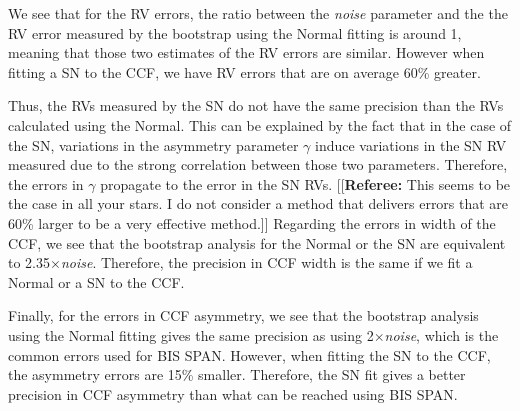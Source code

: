 \documentclass[11pt, oneside]{article}
\newcommand{\comment}[1]{{\color{red}[[\textbf{Referee: }#1]]}}
\begin{document}
We see that for the RV errors, the ratio between the \emph{noise} parameter and the the RV error measured by the bootstrap using the Normal fitting is around 1, meaning that those two estimates of the RV errors are similar. However when fitting a SN to the CCF, we have RV errors that are on average 60\% greater. 

Thus, the RVs measured by the SN do not have the same precision than the RVs calculated using the Normal. This can be explained by the fact that in the case of the SN, variations in the asymmetry parameter $\gamma$ induce variations in the SN RV measured due to the strong correlation between those two parameters. Therefore, the errors in $\gamma$ propagate to the error in the SN RVs.
\comment{This seems to be the case in all your stars. I do not consider a method that delivers errors that are 60\% larger to be a very effective method.}
Regarding the errors in width of the CCF, we see that the bootstrap analysis for the Normal or the SN are equivalent to 2.35$\times$\emph{noise}. Therefore, the precision in CCF width is the same if we fit a Normal or a SN to the CCF.

Finally, for the errors in CCF asymmetry, we see that the bootstrap analysis using the Normal fitting gives the same precision as using 2$\times$\emph{noise}, which is the common errors used for BIS SPAN. However, when fitting the SN to the CCF, the asymmetry errors are 15\% smaller. Therefore, the SN fit gives a better precision in CCF asymmetry than what can be reached using BIS SPAN.
\end{document}
